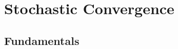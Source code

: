 \documentclass[../main]{subfiles}
\begin{document}
\chapter{Stochastic Convergence}
\section{Fundamentals}
\end{document}
